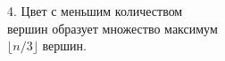 \documentclass[preview]{standalone}
\begin{document}
\begin{center}
4. Цвет с меньшим количеством\\вершин образует множество максимум\\$\lfloor n/3 \rfloor$ вершин.
\end{center}
\end{document}

